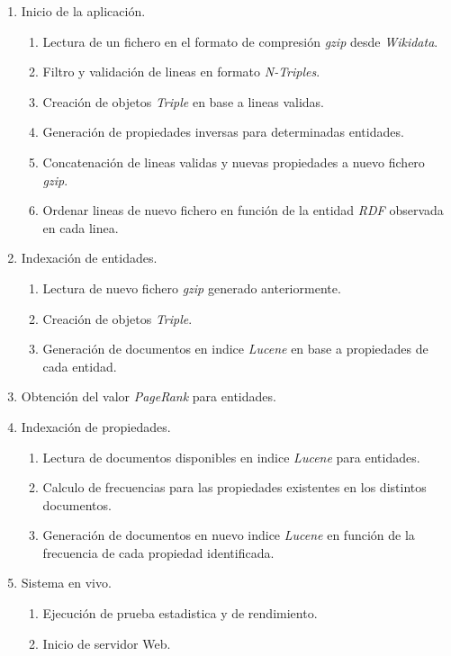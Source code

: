 \begin{enumerate}
    \item Inicio de la aplicación.
    \begin{enumerate}
        \item Lectura de un fichero en el formato de compresión \textit{gzip} \cite{rfc1952} desde \textit{Wikidata}.
        \item Filtro y validación de lineas en formato \textit{N-Triples}.
        \item Creación de objetos \textit{Triple} en base a lineas validas.
        \item Generación de propiedades inversas para determinadas entidades.
        \item Concatenación de lineas validas y nuevas propiedades a nuevo fichero \textit{gzip}.
        \item Ordenar lineas de nuevo fichero en función de la entidad \textit{RDF} observada en cada linea.
    \end{enumerate}
    \item Indexación de entidades.
    \begin{enumerate}
        \item Lectura de nuevo fichero \textit{gzip} generado anteriormente.
        \item Creación de objetos \textit{Triple}.
        \item Generación de documentos en indice \textit{Lucene} en base a propiedades de cada entidad.
    \end{enumerate}
    \item Obtención del valor \textit{PageRank} para entidades.
    \item Indexación de propiedades.
    \begin{enumerate}
        \item Lectura de documentos disponibles en indice \textit{Lucene} para entidades.
        \item Calculo de frecuencias para las propiedades existentes en los distintos documentos.
        \item Generación de documentos en nuevo indice \textit{Lucene} en función de la frecuencia de cada propiedad identificada.
    \end{enumerate}
    \item Sistema en vivo.
    \begin{enumerate}
        \item Ejecución de prueba estadistica y de rendimiento.
        \item Inicio de servidor Web.
    \end{enumerate}
\end{enumerate}


